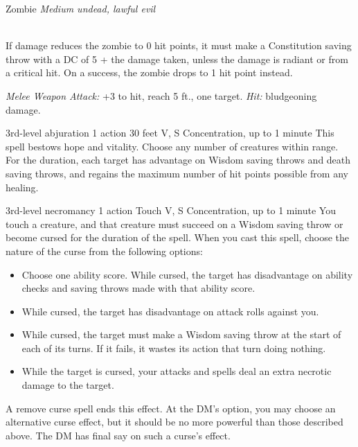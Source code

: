 \documentclass[10pt,twoside,twocolumn,openany]{book}
\begin{document}
\begin{monsterbox}{Zombie}
	\textit{Medium undead, lawful evil}\\
	\hline
	\basics[
		armorclass	= 8,
		hitpoints 		= \dice{3d8 + 9},
		speed		= {20 ft.}
	]
	\hline
	\stats[
		STR	= \stat{13},
		DEX	= \stat{6},
		CON	= \stat{16},
		INT	= \stat{3},
		WIS	= \stat{6},
		CHA	= \stat{5}
	]
	\hline
	\details[
		savingthrows = Wis +0,
		damageimmunities = poison,
		conditionimmunities = {poisoned},
		skills			= {},
		senses		= {darkvision 60 ft., passive Perception 8},
		languages		= {understands all languages it knew in life but can't speak},
		challenge		= 1/4
	]
	\hline \\[1mm]
	\begin{monsteraction}
		If damage reduces the zombie to 0 hit points, it must make a Constitution saving throw with a DC of 5 + the damage taken, unless the damage is radiant or from a critical hit. On a success, the zombie drops to 1 hit point instead.
	\end{monsteraction}
	\begin{monsteraction}[Slam]
		\textit{Melee Weapon Attack:} +3 to hit, reach 5 ft., one target. \textit{Hit:}  bludgeoning damage.
	\end{monsteraction}
\end{monsterbox}
\color{black}
{3rd-level abjuration}
{{\color{action}1 action}}
{30 feet}
{V, S}
{{\color{concentration}Concentration}, up to 1 minute}
%
This spell bestows hope and vitality. Choose any number of creatures within range. For the duration, each target has advantage on Wisdom saving throws and death saving throws, and regains the maximum number of hit points possible from any healing.
 
{3rd-level necromancy}
{{\color{action}1 action}}
{Touch}
{V, S}
{{\color{concentration}Concentration}, up to 1 minute}
You touch a creature, and that creature must succeed on a Wisdom saving throw or become cursed for the duration of the spell. When you cast this spell, choose the nature of the curse from the following options:
\begin{itemize}
	\item Choose one ability score. While cursed, the target has disadvantage on ability checks and saving throws made with that ability score.
	\item While cursed, the target has disadvantage on attack rolls against you.
	\item While cursed, the target must make a Wisdom saving throw at the start of each of its turns. If it fails, it wastes its action that turn doing nothing.
	\item While the target is cursed, your attacks and spells deal an extra  necrotic damage to the target.
\end{itemize}
A remove curse spell ends this effect. At the DM's option, you may choose an alternative curse effect, but it should be no more powerful than those described above. The DM has final say on such a curse's effect.
\end{document}
